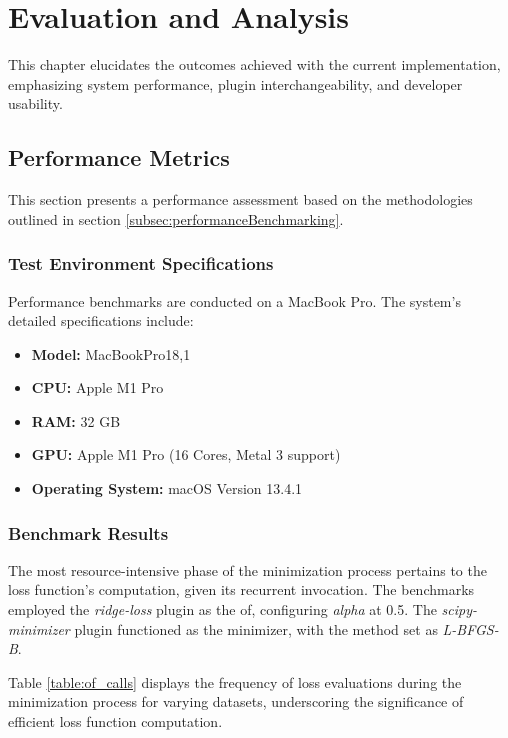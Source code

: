 \documentclass[
  a4paper,  %
  twoside,  %
  bibliography=totoc,
  headsepline,
  cleardoublepage=empty,
  parskip=half,
  draft=false
]{scrbook}
\begin{document}
\chapter{Evaluation and Analysis}
\label{chap:results}

This chapter elucidates the outcomes achieved with the current implementation, emphasizing system performance, plugin interchangeability, and developer usability.

\section{Performance Metrics}
\label{sec:performanceAnalysis}

This section presents a performance assessment based on the methodologies outlined in section \ref{subsec:performanceBenchmarking}.

\subsection{Test Environment Specifications}
\label{subsec:hardwareAndSystemSpecifications}

Performance benchmarks are conducted on a MacBook Pro. The system's detailed specifications include:

\begin{itemize}
    \item \textbf{Model:} MacBookPro18,1
    \item \textbf{CPU:} Apple M1 Pro
    \item \textbf{RAM:} 32 GB
    \item \textbf{GPU:} Apple M1 Pro (16 Cores, Metal 3 support)
    \item \textbf{Operating System:} macOS Version 13.4.1
\end{itemize}


\subsection{Benchmark Results}
\label{subsec:benchmarkingResults}

The most resource-intensive phase of the minimization process pertains to the loss function's computation, given its recurrent invocation.
The benchmarks employed the \emph{ridge-loss} plugin as the \gls{of}, configuring \emph{alpha} at 0.5.
The \emph{scipy-minimizer} plugin functioned as the minimizer, with the method set as \emph{L-BFGS-B}.

Table \ref{table:of_calls} displays the frequency of loss evaluations during the minimization process for varying datasets, underscoring the significance of efficient loss function computation.
\end{document}
